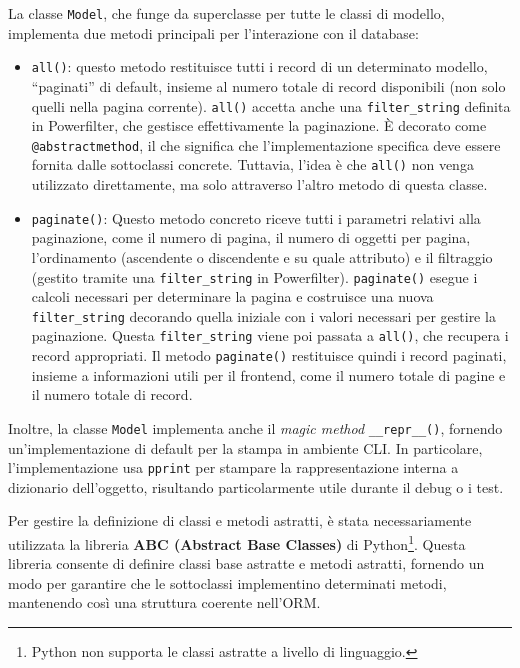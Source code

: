 La classe \texttt{Model}, che funge da superclasse per tutte le classi di modello, implementa due metodi principali per l'interazione con il database:
\begin{itemize}
    \item \texttt{all()}: questo metodo restituisce tutti i record di un determinato modello, ``paginati'' di default, insieme al numero totale di record disponibili (non solo quelli nella pagina corrente). \texttt{all()} accetta anche una \texttt{filter\_string} definita in Powerfilter, che gestisce effettivamente la paginazione. È decorato come \texttt{@abstractmethod}, il che significa che l'implementazione specifica deve essere fornita dalle sottoclassi concrete. Tuttavia, l'idea è che \texttt{all()} non venga utilizzato direttamente, ma solo attraverso l'altro metodo di questa classe.
    \item \texttt{paginate()}: Questo metodo concreto riceve tutti i parametri relativi alla paginazione, come il numero di pagina, il numero di oggetti per pagina, l'ordinamento (ascendente o discendente e su quale attributo) e il filtraggio (gestito tramite una \texttt{filter\_string} in Powerfilter). \texttt{paginate()} esegue i calcoli necessari per determinare la pagina e costruisce una nuova \texttt{filter\_string} decorando quella iniziale con i valori necessari per gestire la paginazione. Questa \texttt{filter\_string} viene poi passata a \texttt{all()}, che recupera i record appropriati. Il metodo \texttt{paginate()} restituisce quindi i record paginati, insieme a informazioni utili per il frontend, come il numero totale di pagine e il numero totale di record.
\end{itemize}

Inoltre, la classe \texttt{Model} implementa anche il \emph{magic method} \texttt{\_\_repr\_\_()}, fornendo un'implementazione di default per la stampa in ambiente CLI. In particolare, l'implementazione usa \texttt{pprint} per stampare la rappresentazione interna a dizionario dell'oggetto, risultando particolarmente utile durante il debug o i test.

Per gestire la definizione di classi e metodi astratti, è stata necessariamente utilizzata la libreria \textbf{ABC (Abstract Base Classes)} di Python\footnote{Python non supporta le classi astratte a livello di linguaggio.}. Questa libreria consente di definire classi base astratte e metodi astratti, fornendo un modo per garantire che le sottoclassi implementino determinati metodi, mantenendo così una struttura coerente nell'ORM.

